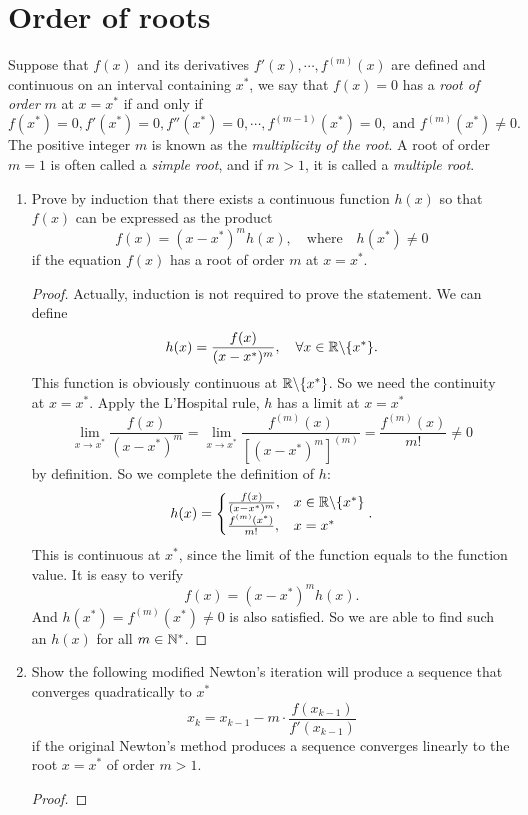 \section{Order of roots}
Suppose that \(f(x)\) and its derivatives \(f'(x),\cdots, f^{(m)}(x)\) are defined and continuous on an interval containing $x^*$, we say that \(f(x)=0\) has a \emph{root of order} $m$ at \(x=x^*\) if and only if
\[ f(x^*)=0, f'(x^*)=0, f''(x^*)=0, \cdots, f^{(m-1)}(x^*)=0, \text{ and } f^{(m)}(x^*)\neq0. \]
The positive integer $m$ is known as the \emph{multiplicity of the root}.
A root of order \(m=1\) is often called a \emph{simple root}, and if \(m>1\), it is called a \emph{multiple root}.
\begin{enumerate}
	\item Prove by induction that there exists a continuous function \(h(x)\) so that \(f(x)\) can be expressed as the product
	\[ f(x)=(x-x^*)^m h(x), \quad \text{where} \quad h(x^*)\neq0 \]
	if the equation \(f(x)\) has a root of order $m$ at \(x=x^*\).
	\begin{proof}
		Actually, induction is not required to prove the statement.
		We can define
		\[ h(x)=\frac{f(x)}{(x-x^*)^m}, \quad \forall x\in\mathbb{R}\backslash\{x^*\}. \]
		This function is obviously continuous at \(\mathbb{R}\backslash\{x^*\}\).
		So we need the continuity at \(x=x^*\).
		Apply the L'Hospital rule, \(h\) has a limit at \(x=x^*\)
		\[ \lim_{x\to x^*}\frac{f(x)}{(x-x^*)^m}=\lim_{x\to x^*}\frac{f^{(m)}(x)}{\left[(x-x^*)^m\right]^{(m)}}		=\frac{f^{(m)}(x)}{m!}\neq0 \]
		by definition.
		So we complete the definition of \(h\):
		\[ h(x)=\begin{cases}
		\frac{f(x)}{(x-x^*)^m}, & x\in\mathbb{R}\backslash\{x^*\}\\
		\frac{f^{(m)}(x^*)}{m!}, & x=x^* \end{cases}. \]
		This is continuous at \(x^*\), since the limit of the function equals to the function value.
		It is easy to verify
		\[ f(x)=(x-x^*)^m h(x). \]
		And \(h(x^*)=f^{(m)}(x^*)\neq0\) is also satisfied.
		So we are able to find such an \(h(x)\) for all \(m\in\mathbb{N}^*\).
	\end{proof}
	\item Show the following modified Newton's iteration will produce a sequence that converges quadratically to $x^*$
	\[ x_k=x_{k-1}-m\cdot\frac{f(x_{k-1})}{f'(x_{k-1})} \]
	if the original Newton's method produces a sequence converges linearly to the root \(x=x^*\) of order \(m>1\).
	\begin{proof}
		

\end{proof}
\end{enumerate}
